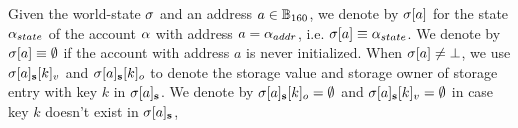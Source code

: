 




Given the {\name} world-state $\mathbf{\sigma}$ and an address $a\in\mathbb{B}_{160}$, we denote by $\mathbf{\sigma} [a]$ for the state $\mathbf{\alpha}_{state}$ of the account $\mathbf{\alpha}$ with address $a=\mathbf{\alpha}_{addr}$, i.e. $\mathbf{\sigma} [a] \equiv \mathbf{\alpha}_{state}$.
We denote by $\mathbf{\sigma}[a]\equiv \emptyset$ if the account with address $a$ is never initialized. 
%
When $\mathbf{\sigma}[a]\neq\bot$, we use $\mathbf{\sigma}[a]_{\bf s}[k]_v$ and $\mathbf{\sigma}[a]_{\bf s}[k]_o$ to denote the storage value and storage owner of storage entry 
with key $k$ in $\mathbf{\sigma}[a]_{\bf s}$. We denote by $\mathbf{\sigma}[a]_{\bf s}[k]_o=\emptyset$ and $\mathbf{\sigma}[a]_{\bf s}[k]_v=\emptyset$ in case key $k$ doesn't exist in $\mathbf{\sigma}[a]_{\bf s}$,



